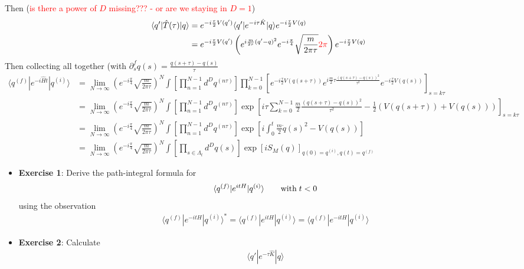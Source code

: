 \documentclass[10pt,a4paper]{article}
\theoremstyle{definition}
\begin{document}
Then (\textcolor{red}{is there a power of $D$ missing??? - or are we staying in $D=1$})
\begin{align}
\langle q'|\hat{T}(\tau)|q\rangle
&=e^{-i\frac{\tau}{2}V(q')}\langle q'|e^{-i\tau\hat{K}}|q\rangle e^{-i\frac{\tau}{2}V(q)}\\
&=e^{-i\frac{\tau}{2}V(q')}\left(e^{i\frac{m}{2\tau}(q'-q)^2}e^{-i\frac{\pi}{4}}\sqrt{\frac{m}{2\pi\tau}}\textcolor{red}{2\pi}\right) e^{-i\frac{\tau}{2}V(q)}\\
\end{align}
Then collecting all together (with $\partial_s^fq(s)=\frac{q(s+\tau)-q(s)}{\tau}$
\begin{align}
\langle q^{(f)}|e^{-i\hat{H}t}|q^{(i)}\rangle 
&=\lim_{N\rightarrow\infty}\left(e^{-i\frac{\pi}{4}}\sqrt{\frac{m}{2\pi\tau}}\right)^N\int\left[\prod_{n=1}^{N-1}d^Dq^{(n\tau)}\right]
\prod_{k=0}^{N-1}\left[e^{-i\frac{\tau}{2}V(q(s+\tau))}e^{i\frac{m}{2}\tau\frac{(q(s+\tau)-q(s))^2}{\tau^2}}e^{-i\frac{\tau}{2}V(q(s))}\right]_{s=k\tau}\\
&=\lim_{N\rightarrow\infty}\left(e^{-i\frac{\pi}{4}}\sqrt{\frac{m}{2\pi\tau}}\right)^N\int\left[\prod_{n=1}^{N-1}d^Dq^{(n\tau)}\right]
\exp\left[i\tau\sum_{k=0}^{N-1}\frac{m}{2}\frac{(q(s+\tau)-q(s))^2}{\tau^2}-\frac{1}{2}(V(q(s+\tau))+V(q(s)))\right]_{s=k\tau}\\
&=\lim_{N\rightarrow\infty}\left(e^{-i\frac{\pi}{4}}\sqrt{\frac{m}{2\pi\tau}}\right)^N\int\left[\prod_{n=1}^{N-1}d^Dq^{(n\tau)}\right]
\exp\left[i\int_0^t\frac{m}{2}\dot{q}(s)^2-V(q(s))\right]\\
&=\lim_{N\rightarrow\infty}\left(e^{-i\frac{\pi}{4}}\sqrt{\frac{m}{2\pi\tau}}\right)^N\int\left[\prod_{s\in\Lambda_t}d^Dq(s)\right]
\exp\left[iS_M(q)\right]_{q(0)=q^{(i)},q(t)=q^{(f)}}
\end{align}
\begin{itemize}
\item {\bf Exercise 1}: Derive the path-integral formula for
\begin{align}
\langle q^{(f)}|e^{itH}|q^{(i)}\rangle\qquad\text{with\;}t<0
\end{align} 
using the observation
\begin{align}
\langle q^{(f)}|e^{-itH}|q^{(i)}\rangle^*=\langle q^{(f)}|e^{itH}|q^{(i)}\rangle=\langle q^{(f)}|e^{-itH}|q^{(i)}\rangle
\end{align}
\item {\bf Exercise 2}: Calculate
\begin{align}
\langle q'|e^{-\tau\hat{K}}|q\rangle
\end{align} 
\end{itemize}
\end{document}
